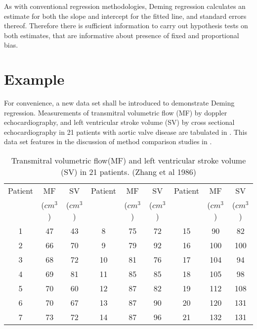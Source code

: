 \documentclass[12pt, a4paper]{report}
\theoremstyle{plain}
\theoremstyle{definition}
\theoremstyle{remark}
\begin{document}
As with conventional regression methodologies, Deming regression calculates an estimate for both the slope and intercept for the
fitted line, and standard errors thereof. Therefore there is sufficient information to carry out hypothesis tests on both
estimates, that are informative about presence of fixed and proportional bias.


\section{Example}
For convenience, a new data set shall be introduced to demonstrate Deming regression. Measurements of transmitral volumetric flow (MF) by doppler echocardiography, and left ventricular stroke volume (SV) by cross sectional echocardiography in 21 patients
with aortic valve disease are tabulated in \citet{zhang}. This data set features in the discussion of method comparison studies
in \citet[p.398]{AltmanBook} .



\begin{table}[h!]
	\begin{center}
		\begin{tabular}{|c|c|c||c|c|c||c|c|c|}
			\hline
			Patient & MF  & SV  & Patient & MF  & SV  & Patient & MF  & SV \\
			&($cm^{3}$)&  ($cm^{3}$) & &($cm^{3}$)&  ($cm^{3}$) & &($cm^{3}$)&  ($cm^{3}$)
			\\
			\hline
			1 & 47 & 43 &  8 & 75 & 72 &  15 & 90 & 82 \\
			2 & 66 & 70 & 9 & 79 & 92 &  16 & 100 & 100 \\
			3 & 68 & 72 & 10 & 81 & 76 & 17 & 104 & 94 \\
			4 & 69 & 81 & 11 & 85 & 85 &  18 & 105 & 98 \\
			5 & 70 & 60 & 12 & 87 & 82 & 19 & 112 & 108 \\
			6 & 70 & 67 & 13 & 87 & 90 & 20 & 120 & 131 \\
			7 & 73 & 72 & 14 & 87 & 96 &  21 & 132 & 131 \\
			
			\hline
		\end{tabular}
		\caption{Transmitral volumetric flow(MF) and left ventricular
			stroke volume (SV) in 21 patients. (Zhang et al 1986)}
	\end{center}
\end{table}
\end{document}
